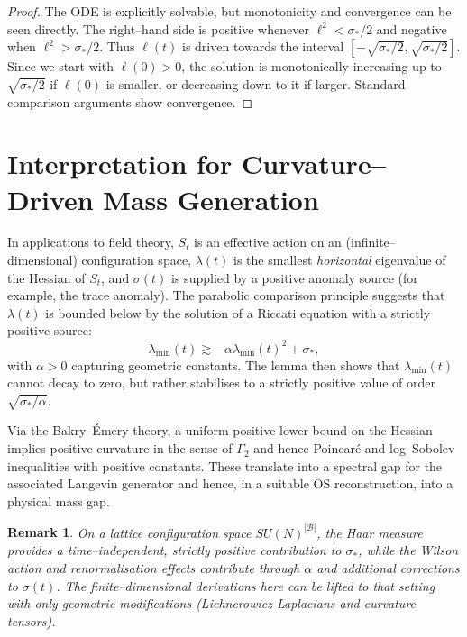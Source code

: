\documentclass[11pt]{article}
\newtheorem{remark}[theorem]{Remark}
\begin{document}
\begin{proof}
The ODE is explicitly solvable, but monotonicity and convergence can be
seen directly. The right--hand side is positive whenever
$\ell^2 < \sigma_*/2$ and negative when $\ell^2>\sigma_*/2$. Thus
$\ell(t)$ is driven towards the interval $[-\sqrt{\sigma_*/2},
\sqrt{\sigma_*/2}]$. Since we start with $\ell(0)>0$, the solution is
monotonically increasing up to $\sqrt{\sigma_*/2}$ if $\ell(0)$ is
smaller, or decreasing down to it if larger. Standard comparison
arguments show convergence.
\end{proof}

\section{Interpretation for Curvature--Driven Mass Generation}

In applications to field theory, $S_t$ is an effective action on an
(infinite--dimensional) configuration space, $\lambda(t)$ is the
smallest \emph{horizontal} eigenvalue of the Hessian of $S_t$, and
$\sigma(t)$ is supplied by a positive anomaly source (for example, the
trace anomaly). The parabolic comparison principle suggests that
$\lambda(t)$ is bounded below by the solution of a Riccati equation with
a strictly positive source:
\begin{equation}
  \dot\lambda_{\min}(t) \gtrsim -\alpha\lambda_{\min}(t)^2 + \sigma_*,
\end{equation}
with $\alpha>0$ capturing geometric constants. The lemma then shows that
$\lambda_{\min}(t)$ cannot decay to zero, but rather stabilises to a
strictly positive value of order $\sqrt{\sigma_*/\alpha}$.

Via the Bakry--\'Emery theory, a uniform positive lower bound on the
Hessian implies positive curvature in the sense of $\Gamma_2$ and hence
Poincar\'e and log--Sobolev inequalities with positive constants. These
translate into a spectral gap for the associated Langevin generator and
hence, in a suitable OS reconstruction, into a physical mass gap.

\begin{remark}
On a lattice configuration space $SU(N)^{|\mathcal{B}|}$, the Haar
measure provides a time--independent, strictly positive contribution to
$\sigma_*$, while the Wilson action and renormalisation effects contribute
through $\alpha$ and additional corrections to $\sigma(t)$. The finite--dimensional
derivations here can be lifted to that setting with only geometric
modifications (Lichnerowicz Laplacians and curvature tensors).
\end{remark}
\end{document}

